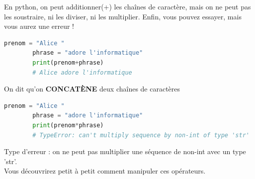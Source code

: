 \begin{Astuce}
    En python, on peut additionner(+) les chaînes de caractère, mais on ne peut pas les soustraire, ni les diviser, ni les multiplier. Enfin, vous pouvez essayer, mais vous aurez une erreur  !
    \begin{lstlisting}[style=pythonstyle, language=Python]
        prenom = "Alice "
        phrase = "adore l'informatique"
        print(prenom+phrase)
        # Alice adore l'informatique\end{lstlisting}
        
    On dit qu'on \textbf{CONCATÈNE} deux chaînes de caractères\\
    \begin{lstlisting}[style=pythonstyle, language=Python]
        prenom = "Alice "
        phrase = "adore l'informatique"
        print(prenom*phrase)
        # TypeError: can't multiply sequence by non-int of type 'str'
    \end{lstlisting}
    Type d'erreur : on ne peut pas multiplier une séquence de non-int avec un type 'str'.\\
    Vous découvrirez petit à petit comment manipuler ces opérateurs.
\end{Astuce}
